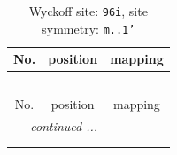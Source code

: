 \documentclass[fleqn,8pt]{jsarticle}
\begin{document}
\renewcommand{\arraystretch}{1.2}
\begin{longtable}{ccc}
\caption{Wyckoff site: {\tt 96i}, site symmetry: {\tt m..1'}}
 \\
 \hline \hline
No. & position & mapping \\ \hline \endfirsthead

\multicolumn{2}{l}{\tablename\ \thetable{}} \\
 \hline \hline
No. & position & mapping \\ \hline \endhead

 \hline \hline
\multicolumn{2}{r}{\footnotesize\it continued ...} \\ \endfoot

 \hline \hline
\multicolumn{2}{r}{} \\ \endlastfoot


\end{longtable}
\end{document}
